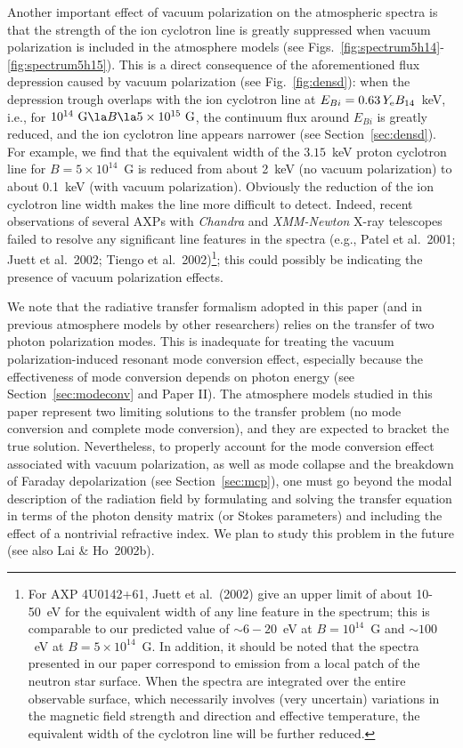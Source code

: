 \documentclass{mn2e}
\newcommand{\etal}{et al.}
\newcommand{\Ye}{Y_{\rm e}}
\newcommand{\Ebi}{E_{Bi}}
\newcommand{\laiho}{Paper II}
\begin{document}
{{Another important effect of vacuum polarization on the atmospheric
spectra is that the strength of the ion cyclotron line is greatly
suppressed when vacuum polarization is included in the atmosphere models
(see Figs.~\ref{fig:spectrum5h14}-\ref{fig:spectrum5h15}).
This is a direct consequence of the aforementioned flux
depression caused by vacuum polarization (see Fig.~\ref{fig:densd}):
when the depression trough overlaps with the ion cyclotron line at
$\Ebi=0.63\,\Ye B_{14}$~keV, i.e., for
$10^{14}\mbox{ G}\la B \la 5\times 10^{15}\mbox{ G}$,
the continuum flux around $\Ebi$ is greatly reduced, and
the ion cyclotron line appears narrower (see Section~\ref{sec:densd}).
For example, we find that the equivalent width of the $3.15$~keV proton
cyclotron line for $B=5\times 10^{14}$~G is reduced from
about 2~keV (no vacuum polarization) to about 0.1~keV
(with vacuum polarization).
Obviously the reduction of the ion cyclotron line width
makes the line more difficult to detect. Indeed, recent observations of
several AXPs with {\it Chandra} and {\it XMM-Newton} X-ray
telescopes failed to resolve any significant line features in the spectra
(e.g., Patel \etal~2001; Juett \etal~2002; Tiengo \etal~2002)\footnote{
For AXP 4U0142+61, Juett \etal~(2002) give an upper limit
of about 10-50~eV for the equivalent width of any line feature in the spectrum;
this is comparable to our predicted value of $\sim 6-20$~eV
at $B=10^{14}$~G and $\sim 100$~eV
at $B=5\times 10^{14}$~G.  In addition, it should be noted that the spectra
presented in our paper correspond to emission from a local patch of the
neutron star surface.  When the spectra are integrated over
the entire observable surface, which necessarily involves (very uncertain)
variations in the magnetic field strength and direction and
effective temperature, the equivalent width of the cyclotron line will be
further reduced.}; this could possibly be indicating the presence of vacuum
polarization effects.

We note that the radiative transfer formalism adopted in this paper
(and in previous atmosphere models by other researchers) relies on
the transfer of two photon polarization modes. This is inadequate
for treating the vacuum polarization-induced resonant mode conversion effect,
especially because the effectiveness of mode conversion depends on
photon energy (see Section~\ref{sec:modeconv} and \laiho).
The atmosphere models studied in this paper represent two
limiting solutions to the transfer
problem (no mode conversion and complete mode conversion), and they are
expected to bracket the true solution. Nevertheless, to properly
account for the mode conversion effect associated with vacuum polarization,
as well as mode collapse and the breakdown of Faraday depolarization
(see Section~\ref{sec:mcp}),
one must go beyond the modal description of the radiation field by formulating
and solving the transfer equation in terms of the photon density
matrix (or Stokes parameters) and including the effect of a nontrivial
refractive index.  We plan to study this problem in the future
(see also Lai \& Ho~2002b).

}}
\end{document}
